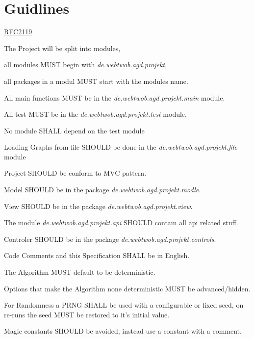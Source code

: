\section{Guidlines}

\newcommand{\basemodule}[1][]{\textit{de.webtwob.agd.projekt#1}}

\href{https://www.ietf.org/rfc/rfc2119.txt}{RFC2119}

\begin{list}{-}{}
\item The Project will be split into modules,

all modules MUST begin with \basemodule,

all packages in a modul MUST start with the modules name.

\item All main functions MUST be in the \basemodule[.main] module.

\item All test MUST be in the \basemodule[.test] module.

\item No module SHALL depend on the test module

\item Loading Graphs from file SHOULD be done in the \basemodule[.file] module

\item Project SHOULD be conform to MVC pattern.

\item Model SHOULD be in the package \basemodule[.modle].

\item View SHOULD be in the package \basemodule[.view].

\item The module \basemodule[.api] SHOULD contain all api related stuff. %

\item Controler SHOULD be in the package \basemodule[.controls].

\item Code Comments and this Specification SHALL be in English.

\item The Algorithm MUST default to be deterministic.

\item Options that make the Algorithm none deterministic MUST be advanced/hidden.

\item For Randomness a PRNG SHALL be used with a configurable or fixed seed,
on re-runs the seed MUST be restored to it's initial value.

\item Magic constants SHOULD be avoided, instead use a constant with a comment.
\end{list}
